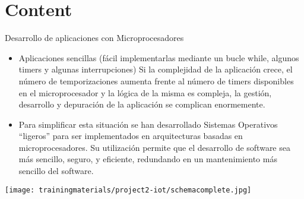\section{Content}

\begin{frame}{Desarrollo de aplicaciones con Microprocesadores}
    \begin{itemize}
        \item Aplicaciones sencillas (fácil implementarlas mediante un bucle while, algunos timers y algunas interrupciones)
Si la complejidad de la aplicación crece, el número de temporizaciones aumenta frente al número de timers disponibles en el microprocesador y la lógica de la misma es compleja, la gestión, desarrollo y depuración de la aplicación se complican enormemente.
        \item Para simplificar esta situación se han desarrollado Sistemas Operativos “ligeros” para ser implementados en arquitecturas basadas en microprocesadores. Su utilización permite que el desarrollo de software sea más sencillo, seguro, y eficiente, redundando en un mantenimiento más sencillo del software.      
    \end{itemize}
     \centering
     \texttt{[image: trainingmaterials/project2-iot/schemacomplete.jpg]}
\end{frame}




